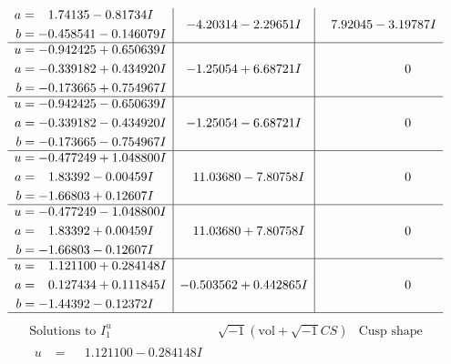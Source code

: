 \documentclass[1p]{elsarticle_modified}
\theoremstyle{definition}
\newcommand{\I}{\sqrt{-1}}
\begin{document}
$$\begin{array}{c|c|c}
\begin{aligned}
a &= \phantom{-}1.74135 - 0.81734 I \\
b &= -0.458541 - 0.146079 I\end{aligned}
 & -4.20314 - 2.29651 I & \phantom{-}7.92045 - 3.19787 I \\ \hline\begin{aligned}
u &= -0.942425 + 0.650639 I \\
a &= -0.339182 + 0.434920 I \\
b &= -0.173665 + 0.754967 I\end{aligned}
 & -1.25054 + 6.68721 I & \phantom{-0.000000 } 0 \\ \hline\begin{aligned}
u &= -0.942425 - 0.650639 I \\
a &= -0.339182 - 0.434920 I \\
b &= -0.173665 - 0.754967 I\end{aligned}
 & -1.25054 - 6.68721 I & \phantom{-0.000000 } 0 \\ \hline\begin{aligned}
u &= -0.477249 + 1.048800 I \\
a &= \phantom{-}1.83392 - 0.00459 I \\
b &= -1.66803 + 0.12607 I\end{aligned}
 & \phantom{-}11.03680 - 7.80758 I & \phantom{-0.000000 } 0 \\ \hline\begin{aligned}
u &= -0.477249 - 1.048800 I \\
a &= \phantom{-}1.83392 + 0.00459 I \\
b &= -1.66803 - 0.12607 I\end{aligned}
 & \phantom{-}11.03680 + 7.80758 I & \phantom{-0.000000 } 0 \\ \hline\begin{aligned}
u &= \phantom{-}1.121100 + 0.284148 I \\
a &= \phantom{-}0.127434 + 0.111845 I \\
b &= -1.44392 - 0.12372 I\end{aligned}
 & -0.503562 + 0.442865 I & \phantom{-0.000000 } 0\\
 \hline 
 \end{array}$$\newpage$$\begin{array}{c|c|c}  
\text{Solutions to }I^u_{1}& \I (\text{vol} + \sqrt{-1}CS) & \text{Cusp shape}\\
 \hline 
\begin{aligned}
u &= \phantom{-}1.121100 - 0.284148 I \\

\end{aligned}
\end{array}$$
\end{document}
